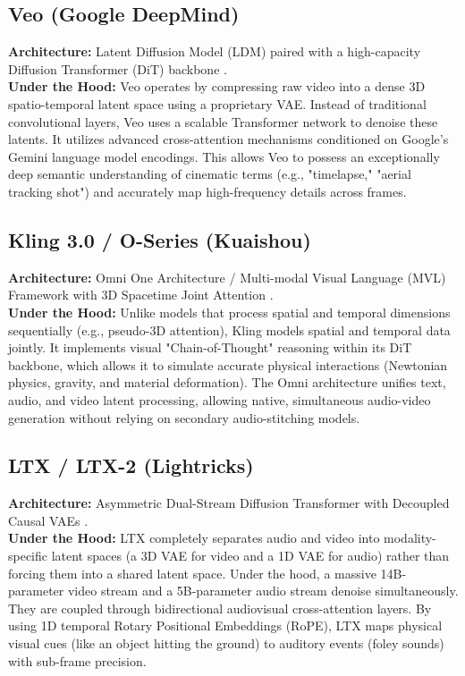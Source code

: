 \documentclass[sigconf]{acmart}
\begin{document}
\subsection{Veo (Google DeepMind)}
\textbf{Architecture:} Latent Diffusion Model (LDM) paired with a high-capacity Diffusion Transformer (DiT) backbone \cite{deepmind2024veo}. \\
\textbf{Under the Hood:} Veo operates by compressing raw video into a dense 3D spatio-temporal latent space using a proprietary VAE. Instead of traditional convolutional layers, Veo uses a scalable Transformer network to denoise these latents. It utilizes advanced cross-attention mechanisms conditioned on Google's Gemini language model encodings. This allows Veo to possess an exceptionally deep semantic understanding of cinematic terms (e.g., "timelapse," "aerial tracking shot") and accurately map high-frequency details across frames.

\subsection{Kling 3.0 / O-Series (Kuaishou)}
\textbf{Architecture:} Omni One Architecture / Multi-modal Visual Language (MVL) Framework with 3D Spacetime Joint Attention \cite{kuaishou2025kling}. \\
\textbf{Under the Hood:} Unlike models that process spatial and temporal dimensions sequentially (e.g., pseudo-3D attention), Kling models spatial and temporal data jointly. It implements visual "Chain-of-Thought" reasoning within its DiT backbone, which allows it to simulate accurate physical interactions (Newtonian physics, gravity, and material deformation). The Omni architecture unifies text, audio, and video latent processing, allowing native, simultaneous audio-video generation without relying on secondary audio-stitching models.

\subsection{LTX / LTX-2 (Lightricks)}
\textbf{Architecture:} Asymmetric Dual-Stream Diffusion Transformer with Decoupled Causal VAEs \cite{hacohen2026ltx}. \\
\textbf{Under the Hood:} LTX completely separates audio and video into modality-specific latent spaces (a 3D VAE for video and a 1D VAE for audio) rather than forcing them into a shared latent space. Under the hood, a massive 14B-parameter video stream and a 5B-parameter audio stream denoise simultaneously. They are coupled through bidirectional audiovisual cross-attention layers. By using 1D temporal Rotary Positional Embeddings (RoPE), LTX maps physical visual cues (like an object hitting the ground) to auditory events (foley sounds) with sub-frame precision.
\end{document}
